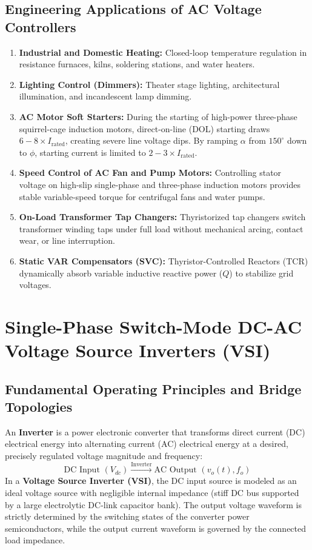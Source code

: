 \documentclass[11pt,a4paper]{article}
\begin{document}
\subsection{Engineering Applications of AC Voltage Controllers}
\begin{enumerate}[leftmargin=*]
  \item \textbf{Industrial and Domestic Heating:} Closed-loop temperature regulation in resistance furnaces, kilns, soldering stations, and water heaters.
  \item \textbf{Lighting Control (Dimmers):} Theater stage lighting, architectural illumination, and incandescent lamp dimming.
  \item \textbf{AC Motor Soft Starters:} During the starting of high-power three-phase squirrel-cage induction motors, direct-on-line (DOL) starting draws $6 - 8 \times I_{\text{rated}}$, creating severe line voltage dips. By ramping $\alpha$ from $150^\circ$ down to $\phi$, starting current is limited to $2 - 3 \times I_{\text{rated}}$.
  \item \textbf{Speed Control of AC Fan and Pump Motors:} Controlling stator voltage on high-slip single-phase and three-phase induction motors provides stable variable-speed torque for centrifugal fans and water pumps.
  \item \textbf{On-Load Transformer Tap Changers:} Thyristorized tap changers switch transformer winding taps under full load without mechanical arcing, contact wear, or line interruption.
  \item \textbf{Static VAR Compensators (SVC):} Thyristor-Controlled Reactors (TCR) dynamically absorb variable inductive reactive power ($Q$) to stabilize grid voltages.
\end{enumerate}


\section{Single-Phase Switch-Mode DC-AC Voltage Source Inverters (VSI)}

\subsection{Fundamental Operating Principles and Bridge Topologies}

An \textbf{Inverter} is a power electronic converter that transforms direct current (DC) electrical energy into alternating current (AC) electrical energy at a desired, precisely regulated voltage magnitude and frequency:
\begin{equation}
\text{DC Input } (V_{dc}) \xrightarrow{\text{Inverter}} \text{AC Output } (v_o(t), f_o)
\end{equation}
In a \textbf{Voltage Source Inverter (VSI)}, the DC input source is modeled as an ideal voltage source with negligible internal impedance (stiff DC bus supported by a large electrolytic DC-link capacitor bank). The output voltage waveform is strictly determined by the switching states of the converter power semiconductors, while the output current waveform is governed by the connected load impedance.
\end{document}
